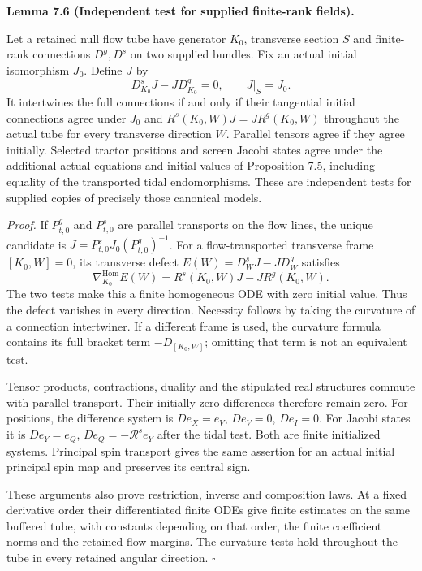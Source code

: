 \documentclass[
  english,
  11pt,
  reqno]{amsart}
\makeatletter
\newcommand{\pandocstatementheading}[1]{%
  \par\if@nobreak\else
    \addpenalty{\@beginparpenalty}%
    \addvspace{.5\baselineskip plus .2\baselineskip minus .2\baselineskip}%
  \fi
  {\normalfont\bfseries #1\par}%
  \nobreak\@afterindenttrue\@afterheading
}
\makeatother
\begin{document}
\pandocstatementheading{\leavevmode{}\label{lem:online-initialized-finite-rank-test}Lemma 7.6 (Independent test for supplied finite-rank fields).}

Let a retained null flow tube have generator \(K_0\), transverse section
\(S\) and finite-rank connections \(D^g,D^s\) on two supplied bundles.
Fix an actual initial isomorphism \(J_0\). Define \(J\) by%
 \[
D^s_{K_0}J-JD^g_{K_0}=0,\qquad J|_S=J_0.
\] It intertwines the full connections if and only if their tangential
initial connections agree under \(J_0\) and \(R^s(K_0,W)J=JR^g(K_0,W)\)
throughout the actual tube for every transverse direction \(W\).
Parallel tensors agree if they agree initially. Selected tractor
positions and screen Jacobi states agree under the additional actual
equations and initial values of Proposition 7.5, including equality of
the transported tidal endomorphisms. These are independent tests for
supplied copies of precisely those canonical models.

\emph{Proof.} If \(P^g_{t,0}\) and \(P^s_{t,0}\) are parallel transports
on the flow lines, the unique candidate is
\(J=P^s_{t,0}J_0(P^g_{t,0})^{-1}\). For a flow-transported transverse
frame \([K_0,W]=0\), its transverse defect \(E(W)=D^s_WJ-JD^g_W\)
satisfies%
 \[
\nabla_{K_0}^{\operatorname{Hom}}E(W)
=R^s(K_0,W)J-JR^g(K_0,W).
\] The two tests make this a finite homogeneous ODE with zero initial
value. Thus the defect vanishes in every direction. Necessity follows by
taking the curvature of a connection intertwiner. If a different frame
is used, the curvature formula contains its full bracket term
\(-D_{[K_0,W]}\); omitting that term is not an equivalent test.

Tensor products, contractions, duality and the stipulated real
structures commute with parallel transport. Their initially zero
differences therefore remain zero. For positions, the difference system
is \(D e_X=e_V\), \(D e_V=0\), \(D e_I=0\). For Jacobi states it is
\(D e_Y=e_Q\), \(D e_Q=-\mathcal R^s e_Y\) after the tidal test. Both
are finite initialized systems. Principal spin transport gives the same
assertion for an actual initial principal spin map and preserves its
central sign.

These arguments also prove restriction, inverse and composition laws. At
a fixed derivative order their differentiated finite ODEs give finite
estimates on the same buffered tube, with constants depending on that
order, the finite coefficient norms and the retained flow margins. The
curvature tests hold throughout the tube in every retained angular
direction. \hfill\(\square\)
\end{document}
